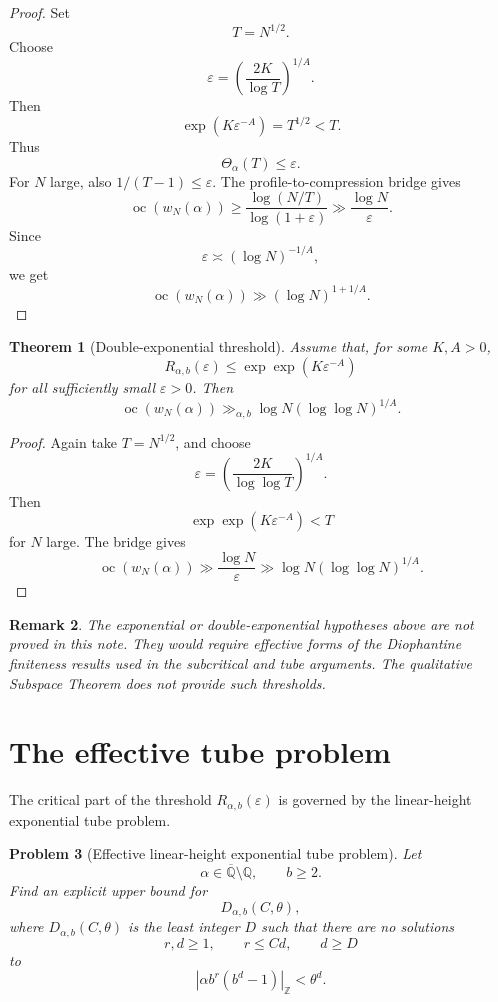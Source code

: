 \documentclass[11pt]{amsart}
\newtheorem{theorem}{Theorem}[section]
\newtheorem{problem}[theorem]{Problem}
\newtheorem{remark}[theorem]{Remark}
\DeclareMathOperator{\oc}{oc}
\newcommand{\normZ}[1]{\left|#1\right|_{\mathbb Z}}
\begin{document}
\begin{proof}
Set
\[
T=N^{1/2}.
\]
Choose
\[
\varepsilon
=
\left(\frac{2K}{\log T}\right)^{1/A}.
\]
Then
\[
\exp(K\varepsilon^{-A})=T^{1/2}<T.
\]
Thus
\[
\Theta_\alpha(T)\leq\varepsilon.
\]
For \(N\) large, also \(1/(T-1)\leq\varepsilon\). The profile-to-compression bridge gives
\[
\oc(w_N(\alpha))
\geq
\frac{\log(N/T)}{\log(1+\varepsilon)}
\gg
\frac{\log N}{\varepsilon}.
\]
Since
\[
\varepsilon\asymp(\log N)^{-1/A},
\]
we get
\[
\oc(w_N(\alpha))
\gg
(\log N)^{1+1/A}.
\]
\end{proof}

\begin{theorem}[Double-exponential threshold]
Assume that, for some \(K,A>0\),
\[
R_{\alpha,b}(\varepsilon)
\leq
\exp\exp(K\varepsilon^{-A})
\]
for all sufficiently small \(\varepsilon>0\). Then
\[
\oc(w_N(\alpha))
\gg_{\alpha,b}
\log N(\log\log N)^{1/A}.
\]
\end{theorem}

\begin{proof}
Again take \(T=N^{1/2}\), and choose
\[
\varepsilon
=
\left(\frac{2K}{\log\log T}\right)^{1/A}.
\]
Then
\[
\exp\exp(K\varepsilon^{-A})<T
\]
for \(N\) large. The bridge gives
\[
\oc(w_N(\alpha))
\gg
\frac{\log N}{\varepsilon}
\gg
\log N(\log\log N)^{1/A}.
\]
\end{proof}

\begin{remark}
The exponential or double-exponential hypotheses above are not proved in this note. They would require effective forms of the Diophantine finiteness results used in the subcritical and tube arguments. The qualitative Subspace Theorem does not provide such thresholds.
\end{remark}

\section{The effective tube problem}

The critical part of the threshold \(R_{\alpha,b}(\varepsilon)\) is governed by the linear-height exponential tube problem.

\begin{problem}[Effective linear-height exponential tube problem]
Let
\[
\alpha\in\overline{\mathbb Q}\setminus\mathbb Q,
\qquad
b\geq 2.
\]
Find an explicit upper bound for
\[
D_{\alpha,b}(C,\theta),
\]
where \(D_{\alpha,b}(C,\theta)\) is the least integer \(D\) such that there are no solutions
\[
r,d\geq1,\qquad r\leq Cd,\qquad d\geq D
\]
to
\[
\normZ{\alpha b^r(b^d-1)}<\theta^d.
\]
\end{problem}
\end{document}
